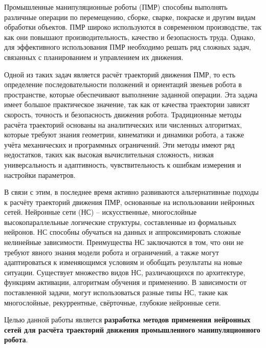 Промышленные манипуляционные роботы (ПМР) способны выполнять различные операции по перемещению, сборке, сварке, покраске и другим видам обработки объектов. ПМР широко используются в современном производстве, так как они повышают производительность, качество и безопасность труда. Однако, для эффективного использования ПМР необходимо решать ряд сложных задач, связанных с планированием и управлением их движения.

Одной из таких задач является расчёт траекторий движения ПМР, то есть определение последовательности положений и ориентаций звеньев робота в пространстве, которые обеспечивают выполнение заданной операции. Эта задача имеет большое практическое значение, так как от качества траектории зависят скорость, точность и безопасность движения робота. Традиционные методы расчёта траекторий основаны на аналитических или численных алгоритмах, которые требуют знания геометрии, кинематики и динамики робота, а также учёта механических и программных ограничений. Эти методы имеют ряд недостатков, таких как высокая вычислительная сложность, низкая универсальность и адаптивность, чувствительность к ошибкам измерения и настройки параметров.

В связи с этим, в последнее время активно развиваются альтернативные подходы к расчёту траекторий движения ПМР, основанные на использовании нейронных сетей. Нейронные сети (НС) -- искусственные, многослойные высокопараллельные логические структуры, составленные из формальных нейронов.\cite{Big_Rus_Book}
НС способны обучаться на данных и аппроксимировать сложные нелинейные зависимости. Преимущества НС заключаются в том, что они не требуют явного знания модели робота и ограничений, а также могут адаптироваться к изменяющимся условиям и обобщать результаты на новые ситуации. Существует множество видов НС, различающихся по архитектуре, функциям активации, алгоритмам обучения и применению. В зависимости от поставленной задачи, могут использоваться разные типы НС, такие как многослойные, рекуррентные, свёрточные, глубокие нейронные сети.\cite{NW_Class_Art}

\newpage
Целью данной работы является \textbf{разработка методов применения нейронных сетей для расчёта траекторий движения промышленного манипуляционного робота}.

